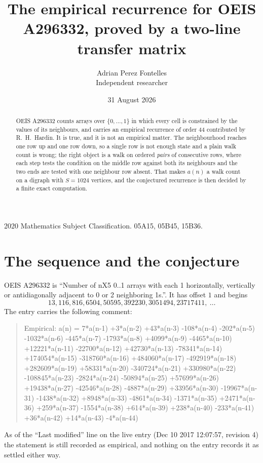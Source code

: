 \documentclass[11pt,a4paper]{article}
\title{The empirical recurrence for OEIS A296332, proved by a two-line transfer matrix}
\author{Adrian Perez Fontelles\\ \small Independent researcher}
\date{31 August 2026}
\theoremstyle{plain}
\theoremstyle{definition}
\begin{document}
\maketitle

\begin{abstract}
OEIS A296332 counts arrays over $\{0,\dots,1\}$ in which every cell is constrained by the
values of its neighbours, and carries an empirical recurrence of order $44$ contributed
by R.~H.~Hardin. It is true, and it is not an empirical matter. The neighbourhood reaches one
row up and one row down, so a single row is not enough state and a plain walk count
is wrong; the right object is a walk on ordered \emph{pairs} of consecutive rows, where
each step tests the condition on the middle row against both its neighbours and the two
ends are tested with one neighbour row absent. That makes $a(n)$ a walk count on a digraph
with $S=1024$ vertices, and the conjectured recurrence is then decided by a finite exact
computation.
\end{abstract}

\noindent\small 2020 Mathematics Subject Classification. 05A15, 05B45, 15B36.\normalsize

\section{The sequence and the conjecture}

OEIS A296332 is ``Number of nX5 0..1 arrays with each 1 horizontally, vertically or antidiagonally adjacent to 0 or 2 neighboring 1s.''. It has offset $1$ and begins
\[
13, 116, 816, 6504, 50595, 392230, 3051494, 23717411,\ \dots
\]
The entry carries the following comment:
\begin{quote}\small
Empirical: a(n) = 7*a(n-1) +3*a(n-2) +43*a(n-3) -108*a(n-4) -202*a(n-5) -1032*a(n-6) -445*a(n-7) -1793*a(n-8) +4099*a(n-9) -4465*a(n-10) +12221*a(n-11) -22700*a(n-12) +42730*a(n-13) -78341*a(n-14) +174054*a(n-15) -318760*a(n-16) +484060*a(n-17) -492919*a(n-18) +282609*a(n-19) +58331*a(n-20) -340724*a(n-21) +330980*a(n-22) -108845*a(n-23) -2824*a(n-24) -50894*a(n-25) +57699*a(n-26) +19438*a(n-27) -42546*a(n-28) -4887*a(n-29) +33956*a(n-30) -19967*a(n-31) -1438*a(n-32) +8948*a(n-33) -4861*a(n-34) -1371*a(n-35) +2471*a(n-36) +259*a(n-37) -1554*a(n-38) +614*a(n-39) +238*a(n-40) -233*a(n-41) +36*a(n-42) +14*a(n-43) -4*a(n-44)
\end{quote}
As of the ``Last modified'' line on the live entry (Dec 10 2017 12:07:57, revision 4) the statement is
still recorded as empirical, and nothing on the entry records it as settled either way.
\end{document}
